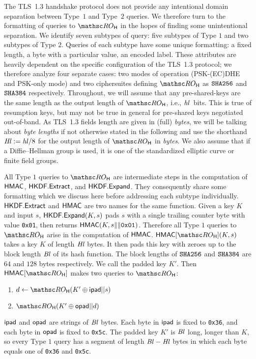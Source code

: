 The TLS~1.3 handshake protocol does not provide any intentional domain separation between Type~$1$ and Type~$2$ queries.
We therefore turn to the formatting of queries to $\ROhash$ in the hopes of finding some unintentional separation.
We identify seven subtypes of query: five subtypes of Type $1$ and two subtypes of Type $2$.
Queries of each subtype have some unique formatting: a fixed length, a byte with a particular value, an encoded label. 
These attributes are heavily dependent on the specific configuration of the TLS~1.3 protocol; we therefore analyze four separate cases: two modes of operation (PSK-(EC)DHE and PSK-only mode) and two ciphersuites defining $\ROhash$ as $\texttt{SHA{256}}$ and $\texttt{SHA{384}}$ respectively.
Throughout, we will assume that any pre-shared-keys are the same length as the output length of $\ROhash$, i.e., $\mathit{hl}$~bits.
This is true of resumption keys, but may not be true in general for pre-shared keys negotiated out-of-band. 
As TLS~1.3 fields length are given in (full) \emph{bytes}, we will be talking about \emph{byte lengths} if not otherwise stated in the following and use the shorthand $\mathit{Hl} := \mathit{hl}/8$ for the output length of $\ROhash$ in \emph{bytes}.
We also assume that if a Diffie--Hellman group is used, it is one of the standardized elliptic curve or finite field groups. 

All Type $1$ queries to $\ROhash$ are intermediate steps in the computation of $\mathsf{HMAC}$, $\mathsf{HKDF.Extract}$, and $\mathsf{HKDF.Expand}$.
They consequently share some formatting which we discuss here before addressing each subtype individually.
$\mathsf{HKDF.Extract}$ and $\mathsf{HMAC}$ are two names for the same function.
Given a key $K$ and input $s$, $\mathsf{HKDF.Expand}(K,s)$ pads $s$ with a single trailing counter byte with value \texttt{0x01}, then returns $\mathsf{HMAC}(K, s\|\|\texttt{0x01})$.
Therefore all Type $1$ queries to $\ROhash$ arise in the computation of $\mathsf{HMAC}$. 
$\HMAC[\ROhash](K,s)$ takes a key $K$ of length $\mathit{Hl}$ bytes.
It then pads this key with zeroes up to the block length $\mathit{Bl}$ of its hash function.
The block lengths of $\texttt{SHA{256}}$ and $\texttt{SHA{384}}$ are $64$ and $128$ bytes respectively. 
We call the padded key $K'$. 
Then $\HMAC[\ROhash]$ makes two queries to $\ROhash$:
\begin{enumerate}
	\item $d \gets \ROhash(K' \oplus \ipad || s)$
	\item $\ROhash(K' \oplus \opad || d)$
\end{enumerate}
$\mathsf{ipad}$ and $\mathsf{opad}$ are strings of $\mathit{Bl}$ bytes. Each byte in $\mathsf{ipad}$ is fixed to \texttt{0x36}, and each byte in $\mathsf{opad}$ is fixed to \texttt{0x5c}.
The padded key $K'$ is $\mathit{Bl}$ long, longer than $K$, so every Type $1$ query has a segment of length $\mathit{Bl}-\mathit{Hl}$ bytes in which each byte equals one of \texttt{0x36} and \texttt{0x5c}. 

